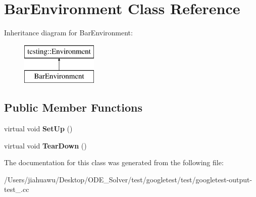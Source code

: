 \hypertarget{class_bar_environment}{}\section{Bar\+Environment Class Reference}
\label{class_bar_environment}
Inheritance diagram for Bar\+Environment\+:\begin{figure}[H]
\begin{center}
\leavevmode
\includegraphics[height=2.000000cm]{class_bar_environment}
\end{center}
\end{figure}
\subsection*{Public Member Functions}
\begin{DoxyCompactItemize}
\item 
\mbox{\label{class_bar_environment_a88e17c5dd1dcea7a4538f2f3c6bf7bdd}} 
virtual void {\bfseries Set\+Up} ()
\item 
\mbox{\label{class_bar_environment_a384f951da72a2a18bb0c2b3506376b09}} 
virtual void {\bfseries Tear\+Down} ()
\end{DoxyCompactItemize}


The documentation for this class was generated from the following file\+:\begin{DoxyCompactItemize}
\item 
/\+Users/jiahuawu/\+Desktop/\+O\+D\+E\+\_\+\+Solver/test/googletest/test/googletest-\/output-\/test\+\_\+.\+cc\end{DoxyCompactItemize}
